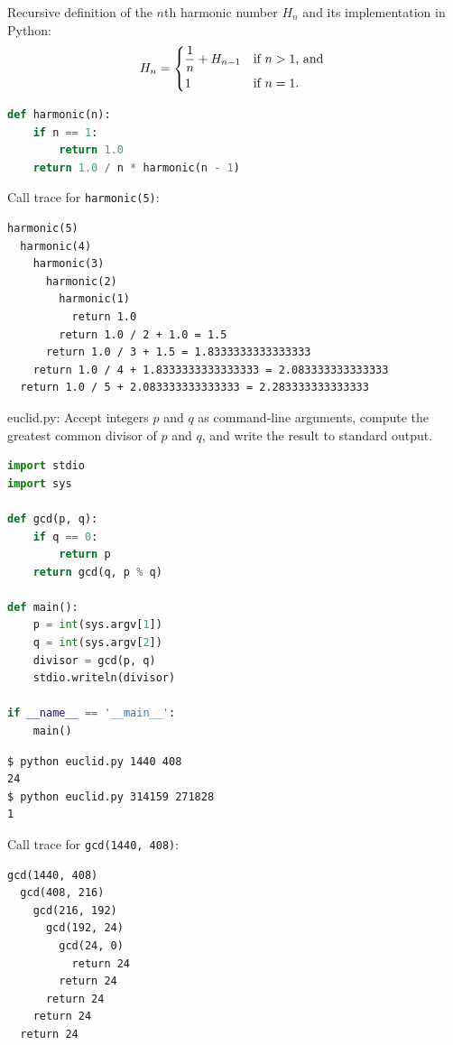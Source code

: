 \documentclass[8pt,a4paper,compress,handout]{beamer}
\begin{document}
\begin{frame}[fragile]
Recursive definition of the $n$th harmonic number $H_n$ and its implementation in Python: 
\[
H_n = \begin{dcases*}
\frac{1}{n} + H_{n-1} & if $n > 1$, and \\
1       & if $n=1$.
\end{dcases*}
\]

\begin{lstlisting}[language=Python]
def harmonic(n):
    if n == 1:
        return 1.0
    return 1.0 / n * harmonic(n - 1)
\end{lstlisting}

\bigskip

Call trace for \lstinline{harmonic(5)}:
\begin{lstlisting}[language={}]
harmonic(5)
  harmonic(4)
    harmonic(3)
      harmonic(2)
        harmonic(1)
          return 1.0
        return 1.0 / 2 + 1.0 = 1.5
      return 1.0 / 3 + 1.5 = 1.8333333333333333
    return 1.0 / 4 + 1.8333333333333333 = 2.083333333333333
  return 1.0 / 5 + 2.083333333333333 = 2.283333333333333
\end{lstlisting}
\end{frame}

\begin{frame}[fragile]
\begin{framed}
\tiny euclid.py: Accept integers $p$ and $q$ as command-line arguments, compute the greatest common divisor of $p$ and $q$, and write the result to standard output.
\end{framed}

\begin{lstlisting}[language=Python]
import stdio
import sys

def gcd(p, q):
    if q == 0:
        return p
    return gcd(q, p % q)

def main():
    p = int(sys.argv[1])
    q = int(sys.argv[2])
    divisor = gcd(p, q)
    stdio.writeln(divisor)

if __name__ == '__main__':
    main()
\end{lstlisting}

\begin{lstlisting}[language={}]
$ python euclid.py 1440 408
24
$ python euclid.py 314159 271828
1
\end{lstlisting}
\end{frame}

\begin{frame}[fragile]
Call trace for \lstinline{gcd(1440, 408)}:

\begin{lstlisting}[language={}]
gcd(1440, 408)
  gcd(408, 216)
    gcd(216, 192)
      gcd(192, 24)
        gcd(24, 0)
          return 24
        return 24
      return 24
    return 24
  return 24
\end{lstlisting}
\end{frame}
\end{document}
